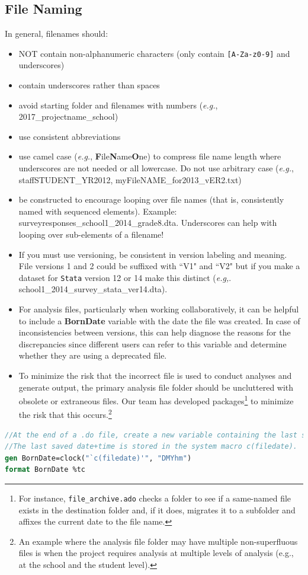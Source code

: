\documentclass[11pt]{article}
\begin{document}
\subsection{File Naming}
In general, filenames should:
\begin{itemize}
	\item NOT contain non-alphanumeric characters (only contain \texttt{[A-Za-z0-9]} and underscores)
	\item contain underscores rather than spaces
	\item avoid starting folder and filenames with numbers (\textit{e.g.},  2017\_projectname\_school)
	\item use consistent abbreviations
	\item use camel case ({\it{e.g.}}, \textbf{F}ile\textbf{N}ame\textbf{O}ne) to compress file name length where underscores are not needed or all lowercase. Do not use arbitrary case (\textit{e.g.},  staffSTUDENT\_YR2012, myFileNAME\_for2013\_vER2.txt)
	\item be constructed to encourage looping over file names (that is, consistently named with sequenced elements). Example:  surveyresponses\_school1\_2014\_grade8.dta.   Underscores can help with looping over sub-elements of a filename!
	\item If you must use versioning, be consistent in version labeling and meaning.  File versions 1 and 2 could be suffixed with ``V1" and ``V2" but if you make a dataset for \texttt{Stata} version 12 or 14 make this distinct (\textit{e.g,}. school1\_2014\_survey\_stata\_ver14.dta).
	\item For analysis files, particularly when working collaboratively, it can be helpful to include a \textbf{BornDate} variable with the date the file was created. In case of inconsistencies between versions, this can help diagnose the reasons for the discrepancies since different users can refer to this variable and determine whether they are using a deprecated file.
	\item To minimize the risk that the incorrect file is used to conduct analyses and generate output, the primary analysis file folder should be uncluttered with obsolete or extraneous files. Our team has developed packages\footnote{For instance, \texttt{file\_archive.ado} checks a folder to see if a same-named file exists in the destination folder and, if it does, migrates it to a subfolder and affixes the current date to the file name.} to minimize the risk that this occurs.\footnote{An example where the analysis file folder may have multiple non-superfluous files is when the project requires analysis at multiple levels of analysis (e.g., at the school and the student level).}
\end{itemize}
\begin{lstlisting}[language=Stata, numbers=none]
//At the end of a .do file, create a new variable containing the last saved date/time of the file.
//The last saved date+time is stored in the system macro c(filedate).
gen BornDate=clock("`c(filedate)'", "DMYhm")
format BornDate %tc
\end{lstlisting}
\end{document}
